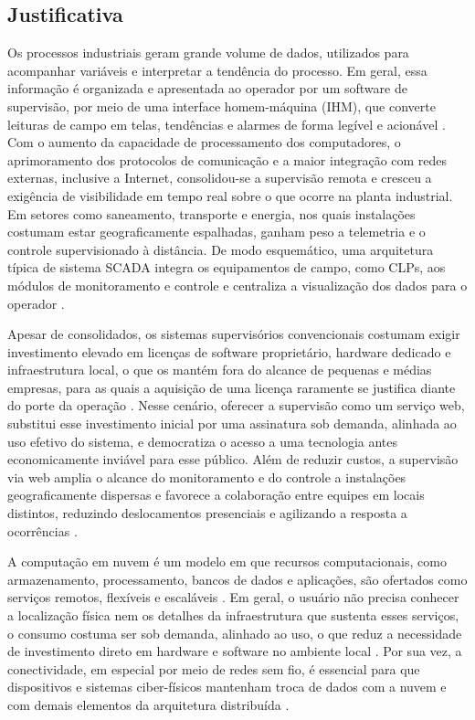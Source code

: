 \subsection{Justificativa}

\par Os processos industriais geram grande volume de dados, utilizados para acompanhar variáveis e interpretar a tendência do processo. Em geral, essa informação é organizada e apresentada ao operador por um software de supervisão, por meio de uma interface homem-máquina (IHM), que converte leituras de campo em telas, tendências e alarmes de forma legível e acionável \cite{ZANGHI2019_SCADA_CONCEITOS}. Com o aumento da capacidade de processamento dos computadores, o aprimoramento dos protocolos de comunicação e a maior integração com redes externas, inclusive a Internet, consolidou-se a supervisão remota e cresceu a exigência de visibilidade em tempo real sobre o que ocorre na planta industrial. Em setores como saneamento, transporte e energia, nos quais instalações costumam estar geograficamente espalhadas, ganham peso a telemetria e o controle supervisionado à distância. De modo esquemático, uma arquitetura típica de sistema SCADA integra os equipamentos de campo, como CLPs, aos módulos de monitoramento e controle e centraliza a visualização dos dados para o operador \cite{AHMED2011_EFFICIENT_WEB_SCADA}.

\par Apesar de consolidados, os sistemas supervisórios convencionais costumam exigir investimento elevado em licenças de software proprietário, hardware dedicado e infraestrutura local, o que os mantém fora do alcance de pequenas e médias empresas, para as quais a aquisição de uma licença raramente se justifica diante do porte da operação \cite{PHUYAL2020_COST_EFFICIENT_SCADA}. Nesse cenário, oferecer a supervisão como um serviço web, substitui esse investimento inicial por uma assinatura sob demanda, alinhada ao uso efetivo do sistema, e democratiza o acesso a uma tecnologia antes economicamente inviável para esse público. Além de reduzir custos, a supervisão via web amplia o alcance do monitoramento e do controle a instalações geograficamente dispersas e favorece a colaboração entre equipes em locais distintos, reduzindo deslocamentos presenciais e agilizando a resposta a ocorrências \cite{AHMED2011_EFFICIENT_WEB_SCADA}.

\par A computação em nuvem é um modelo em que recursos computacionais, como armazenamento, processamento, bancos de dados e aplicações, são ofertados como serviços remotos, flexíveis e escaláveis \cite{PEDROSA2011_COMPUTACAO_NUVEM}. Em geral, o usuário não precisa conhecer a localização física nem os detalhes da infraestrutura que sustenta esses serviços, o consumo costuma ser sob demanda, alinhado ao uso, o que reduz a necessidade de investimento direto em hardware e software no ambiente local \cite{HENRIQUES2010_CLOUD_COMPUTING_TCC}. Por sua vez, a conectividade, em especial por meio de redes sem fio, é essencial para que dispositivos e sistemas ciber-físicos mantenham troca de dados com a nuvem e com demais elementos da arquitetura distribuída \cite{STANKOVIC2014_IOT_RESEARCH_DIRECTIONS,MONOSTORI2016_CPS_MANUFACTURING}.